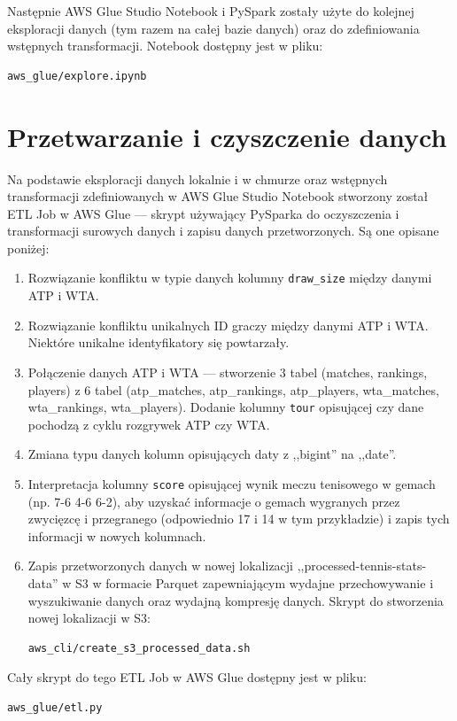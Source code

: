 \documentclass[12pt, a4paper]{article}
\begin{document}
Następnie AWS Glue Studio Notebook i PySpark zostały użyte do kolejnej eksploracji danych (tym razem na całej bazie danych) oraz do zdefiniowania wstępnych transformacji. Notebook dostępny jest w pliku:
\begin{verbatim}
aws_glue/explore.ipynb
\end{verbatim}


\section{Przetwarzanie i czyszczenie danych} \label{sec:transform}
Na podstawie eksploracji danych lokalnie i w chmurze oraz wstępnych transformacji zdefiniowanych w AWS Glue Studio Notebook stworzony został ETL Job w AWS Glue --- skrypt używający PySparka do oczyszczenia i transformacji surowych danych i zapisu danych przetworzonych. Są one opisane poniżej:
\begin{enumerate}
    \item Rozwiązanie konfliktu w typie danych kolumny \lstinline[style=verbatimStyle]{draw_size} między danymi ATP i WTA.
    \item Rozwiązanie konfliktu unikalnych ID graczy między danymi ATP i WTA. Niektóre unikalne identyfikatory się powtarzały.
    \item Połączenie danych ATP i WTA --- stworzenie 3 tabel (matches, rankings, players) z 6 tabel (atp\_matches, atp\_rankings, atp\_players, wta\_matches, wta\_rankings, wta\_players). Dodanie kolumny \lstinline[style=verbatimStyle]{tour} opisującej czy dane pochodzą z cyklu rozgrywek ATP czy WTA.
    \item Zmiana typu danych kolumn opisujących daty z ,,bigint'' na ,,date''.
    \item Interpretacja kolumny \lstinline[style=verbatimStyle]{score} opisującej wynik meczu tenisowego w gemach (np. 7-6 4-6 6-2), aby uzyskać informacje o gemach wygranych przez zwycięzcę i przegranego (odpowiednio 17 i 14 w tym przykładzie) i zapis tych informacji w nowych kolumnach.
    \item Zapis przetworzonych danych w nowej lokalizacji ,,processed-tennis-stats-data'' w S3 w formacie Parquet zapewniającym wydajne przechowywanie i wyszukiwanie danych oraz wydajną kompresję danych. Skrypt do stworzenia nowej lokalizacji w S3:
\begin{verbatim}
aws_cli/create_s3_processed_data.sh
\end{verbatim}
\end{enumerate}
Cały skrypt do tego ETL Job w AWS Glue dostępny jest w pliku:
\begin{verbatim}
aws_glue/etl.py
\end{verbatim}
\end{document}
